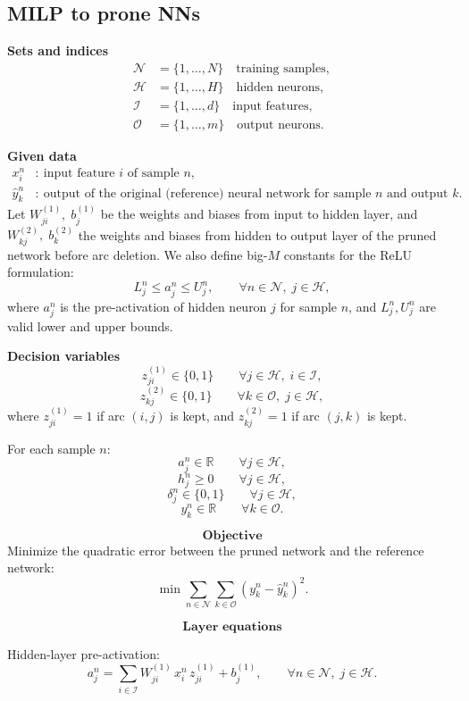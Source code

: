 \documentclass[12pt, a4paper]{article}
\begin{document}
\subsection{MILP to prone NNs}
\textbf{Sets and indices}
\begin{align}
\mathcal{N} &= \{1,\dots,N\} \quad \text{training samples}, \\
\mathcal{H} &= \{1,\dots,H\} \quad \text{hidden neurons}, \\
\mathcal{I} &= \{1,\dots,d\} \quad \text{input features}, \\
\mathcal{O} &= \{1,\dots,m\} \quad \text{output neurons}.
\end{align}

\textbf{Given data}
\begin{align}
x^n_i &:\ \text{input feature } i \text{ of sample } n, \\
\hat{y}^n_k &:\ \text{output of the original (reference) neural network for sample } n \text{ and output } k.
\end{align}
Let $W^{(1)}_{ji},\; b^{(1)}_j$ be the weights and biases from input to hidden layer, and $W^{(2)}_{kj},\; b^{(2)}_k$ the weights and biases from hidden to output layer of the pruned network before arc deletion. We also define big-\(M\) constants for the ReLU formulation:
\[
L^n_j \le a^n_j \le U^n_j,\qquad \forall n\in\mathcal{N},\; j\in\mathcal{H},
\]
where \(a^n_j\) is the pre-activation of hidden neuron \(j\) for sample \(n\), and \(L^n_j,U^n_j\) are valid lower and upper bounds.

\textbf{Decision variables}
\[
z^{(1)}_{ji}\in\{0,1\} \qquad \forall j\in\mathcal{H},\; i\in\mathcal{I},
\]
\[
z^{(2)}_{kj}\in\{0,1\} \qquad \forall k\in\mathcal{O},\; j\in\mathcal{H},
\]
where \(z^{(1)}_{ji}=1\) if arc \((i,j)\) is kept, and \(z^{(2)}_{kj}=1\) if arc \((j,k)\) is kept.

For each sample \(n\):
\[
a^n_j \in \mathbb{R} \qquad \forall j\in\mathcal{H},
\]
\[
h^n_j \ge 0 \qquad \forall j\in\mathcal{H},
\]
\[
\delta^n_j \in \{0,1\} \qquad \forall j\in\mathcal{H},
\]
\[
y^n_k \in \mathbb{R} \qquad \forall k\in\mathcal{O}.
\]

\[
\textbf{Objective}
\]
Minimize the quadratic error between the pruned network and the reference network:
\[
\min \sum_{n\in\mathcal{N}} \sum_{k\in\mathcal{O}}
\left(y^n_k-\hat{y}^n_k\right)^2.
\]

\[
\textbf{Layer equations}
\]

Hidden-layer pre-activation:
\[
a^n_j = \sum_{i\in\mathcal{I}} W^{(1)}_{ji}\, x^n_i \, z^{(1)}_{ji} + b^{(1)}_j,
\qquad \forall n\in\mathcal{N},\; j\in\mathcal{H}.
\]
\end{document}
